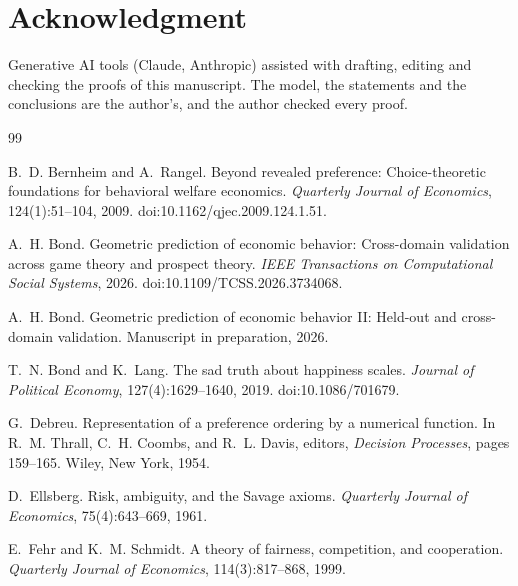 \documentclass[11pt]{article}
\theoremstyle{definition}
\begin{document}
\section*{Acknowledgment}
Generative AI tools (Claude, Anthropic) assisted with drafting, editing and checking the proofs of this manuscript.
The model, the statements and the conclusions are the author's, and the author checked every proof.


\begin{thebibliography}{99}

B.~D. Bernheim and A.~Rangel.
\newblock Beyond revealed preference: Choice-theoretic foundations for behavioral welfare economics.
\newblock \emph{Quarterly Journal of Economics}, 124(1):51--104, 2009.
\newblock doi:10.1162/qjec.2009.124.1.51.

A.~H. Bond.
\newblock Geometric prediction of economic behavior: Cross-domain validation across game theory and prospect theory.
\newblock \emph{IEEE Transactions on Computational Social Systems}, 2026.
\newblock doi:10.1109/TCSS.2026.3734068. %

A.~H. Bond.
\newblock Geometric prediction of economic behavior II: Held-out and cross-domain validation.
\newblock Manuscript in preparation, 2026.

T.~N. Bond and K.~Lang.
\newblock The sad truth about happiness scales.
\newblock \emph{Journal of Political Economy}, 127(4):1629--1640, 2019.
\newblock doi:10.1086/701679.

G.~Debreu.
\newblock Representation of a preference ordering by a numerical function.
\newblock In R.~M. Thrall, C.~H. Coombs, and R.~L. Davis, editors, \emph{Decision Processes}, pages 159--165. Wiley, New York, 1954.

D.~Ellsberg.
\newblock Risk, ambiguity, and the {S}avage axioms.
\newblock \emph{Quarterly Journal of Economics}, 75(4):643--669, 1961.

E.~Fehr and K.~M. Schmidt.
\newblock A theory of fairness, competition, and cooperation.
\newblock \emph{Quarterly Journal of Economics}, 114(3):817--868, 1999.


\end{thebibliography}
\end{document}
